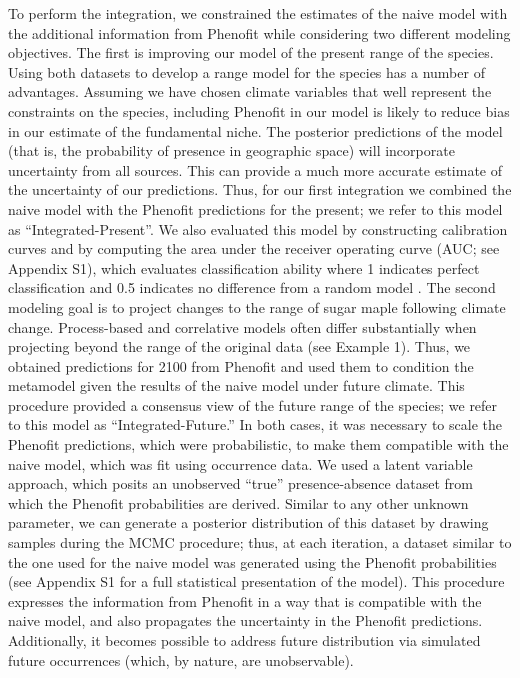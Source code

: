 \documentclass[11pt]{article}
\begin{document}
To perform the integration, we constrained the estimates of the naive model with the additional information from Phenofit while considering two different modeling objectives.
The first is improving our model of the present range of the species.
Using both datasets to develop a range model for the species has a number of advantages.
Assuming we have chosen climate variables that well represent the constraints on the species, including Phenofit in our model is likely to reduce bias in our estimate of the fundamental niche.
The posterior predictions of the model (that is, the probability of presence in geographic space) will incorporate uncertainty from all sources.
This can provide a much more accurate estimate of the uncertainty of our predictions.
Thus, for our first integration we combined the naive model with the Phenofit predictions for the present; we refer to this model as ``Integrated-Present''.
We also evaluated this model by constructing calibration curves and by computing the area under the receiver operating curve (AUC; see Appendix S1), which evaluates classification ability where 1 indicates perfect classification and 0.5 indicates no difference from a random model \citep{Swets1988}.
The second modeling goal is to project changes to the range of sugar maple following climate change.
Process-based and correlative models often differ substantially when projecting beyond the range of the original data (see Example 1).
Thus, we obtained predictions for 2100 from Phenofit \citep{Morin2009} and used them to condition the metamodel given the results of the naive model under future climate.
This procedure provided a consensus view of the future range of the species; we refer to this model as ``Integrated-Future.''
In both cases, it was necessary to scale the Phenofit predictions, which were probabilistic, to make them compatible with the naive model, which was fit using occurrence data.
We used a latent variable approach, which posits an unobserved ``true'' presence-absence dataset from which the Phenofit probabilities are derived. 
Similar to any other unknown parameter, we can generate a posterior distribution of this dataset by drawing samples during the MCMC procedure; thus, at each iteration, a dataset similar to the one used for the naive model was generated using the Phenofit probabilities (see Appendix S1 for a full statistical presentation of the model).
This procedure expresses the information from Phenofit in a way that is compatible with the naive model, and also propagates the uncertainty in the Phenofit predictions.
Additionally, it becomes possible to address future distribution via simulated future occurrences (which, by nature, are unobservable).
\end{document}
